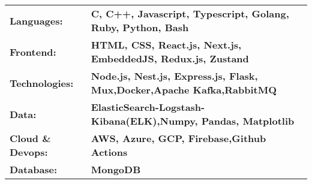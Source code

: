 \vspace{2pt}
\begin{tabular}{ @{} l l @{} }
    \textbf{Languages:}       & \textbf{C, C++, Javascript, Typescript, Golang, Ruby, Python, Bash}               \\
    \textbf{Frontend:}        & \textbf{HTML, CSS, React.js, Next.js, EmbeddedJS, Redux.js, Zustand}               \\
\textbf{Technologies:} & \textbf{Node.js, Nest.js, Express.js, Flask, Mux,Docker,Apache Kafka,RabbitMQ} 
\\
\textbf{Data:}        & \textbf{ElasticSearch-Logstash-Kibana(ELK),Numpy, Pandas, Matplotlib}
\\
\textbf{Cloud \& Devops:} & \textbf{AWS, Azure, GCP, Firebase,Github Actions}                                              \\
    \textbf{Database:}        & \textbf{MongoDB}                                                             \\
\end{tabular}

\vspace{2mm}
